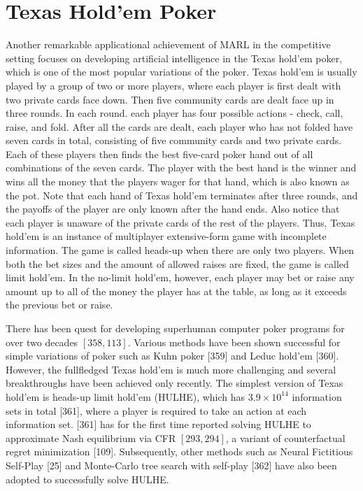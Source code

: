 \documentclass[10pt]{article}
\begin{document}
\section{Texas Hold'em Poker}
Another remarkable applicational achievement of MARL in the competitive setting focuses on developing artificial intelligence in the Texas hold'em poker, which is one of the most popular variations of the poker. Texas hold'em is usually played by a group of two or more players, where each player is first dealt with two private cards face down. Then five community cards are dealt face up in three rounds. In each round. each player has four possible actions - check, call, raise, and fold. After all the cards are dealt, each player who has not folded have seven cards in total, consisting of five community cards and two private cards. Each of these players then finds the best five-card poker hand out of all combinations of the seven cards. The player with the best hand is the winner and wins all the money that the players wager for that hand, which is also known as the pot. Note that each hand of Texas hold'em terminates after three rounds, and the payoffs of the player are only known after the hand ends. Also notice that each player is unaware of the private cards of the rest of the players. Thus, Texas hold'em is an instance of multiplayer extensive-form game with incomplete information. The game is called heads-up when there are only two players. When both the bet sizes and the amount of allowed raises are fixed, the game is called limit hold'em. In the no-limit hold'em, however, each player may bet or raise any amount up to all of the money the player has at the table, as long as it exceeds the previous bet or raise.

There has been quest for developing superhuman computer poker programs for over two decades $[358,113]$. Various methods have been shown successful for simple variations of poker such as Kuhn poker [359] and Leduc hold'em [360]. However, the fullfledged Texas hold'em is much more challenging and several breakthroughs have been achieved only recently. The simplest version of Texas hold'em is heads-up limit hold'em (HULHE), which has $3.9 \times 10^{14}$ information sets in total [361], where a player is required to take an action at each information set. [361] has for the first time reported solving HULHE to approximate Nash equilibrium via CFR $[293,294]$, a variant of counterfactual regret minimization [109]. Subsequently, other methods such as Neural Fictitious Self-Play [25] and Monte-Carlo tree search with self-play [362] have also been adopted to successfully solve HULHE.
\end{document}
